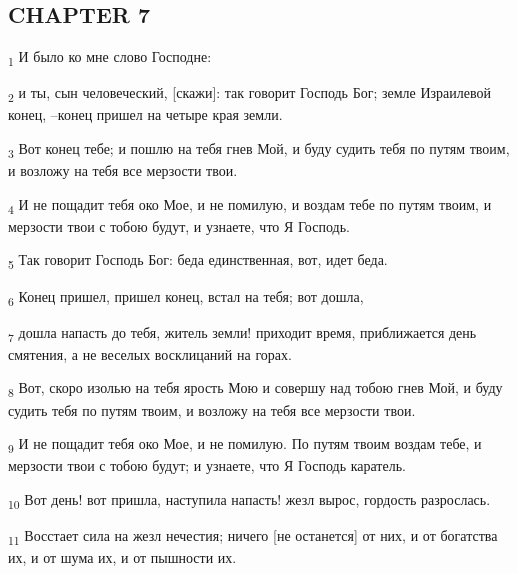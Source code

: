 \subsection{CHAPTER 7}
\begin{tcolorbox}
\textsubscript{1} И было ко мне слово Господне:
\end{tcolorbox}
\begin{tcolorbox}
\textsubscript{2} и ты, сын человеческий, [скажи]: так говорит Господь Бог; земле Израилевой конец, --конец пришел на четыре края земли.
\end{tcolorbox}
\begin{tcolorbox}
\textsubscript{3} Вот конец тебе; и пошлю на тебя гнев Мой, и буду судить тебя по путям твоим, и возложу на тебя все мерзости твои.
\end{tcolorbox}
\begin{tcolorbox}
\textsubscript{4} И не пощадит тебя око Мое, и не помилую, и воздам тебе по путям твоим, и мерзости твои с тобою будут, и узнаете, что Я Господь.
\end{tcolorbox}
\begin{tcolorbox}
\textsubscript{5} Так говорит Господь Бог: беда единственная, вот, идет беда.
\end{tcolorbox}
\begin{tcolorbox}
\textsubscript{6} Конец пришел, пришел конец, встал на тебя; вот дошла,
\end{tcolorbox}
\begin{tcolorbox}
\textsubscript{7} дошла напасть до тебя, житель земли! приходит время, приближается день смятения, а не веселых восклицаний на горах.
\end{tcolorbox}
\begin{tcolorbox}
\textsubscript{8} Вот, скоро изолью на тебя ярость Мою и совершу над тобою гнев Мой, и буду судить тебя по путям твоим, и возложу на тебя все мерзости твои.
\end{tcolorbox}
\begin{tcolorbox}
\textsubscript{9} И не пощадит тебя око Мое, и не помилую. По путям твоим воздам тебе, и мерзости твои с тобою будут; и узнаете, что Я Господь каратель.
\end{tcolorbox}
\begin{tcolorbox}
\textsubscript{10} Вот день! вот пришла, наступила напасть! жезл вырос, гордость разрослась.
\end{tcolorbox}
\begin{tcolorbox}
\textsubscript{11} Восстает сила на жезл нечестия; ничего [не останется] от них, и от богатства их, и от шума их, и от пышности их.
\end{tcolorbox}
